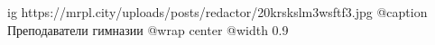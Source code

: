  
 
 
 
 

\ifcmt
  ig https://mrpl.city/uploads/posts/redactor/20krskslm3wsftf3.jpg
	@caption Преподаватели гимназии
  @wrap center
  @width 0.9
\fi
